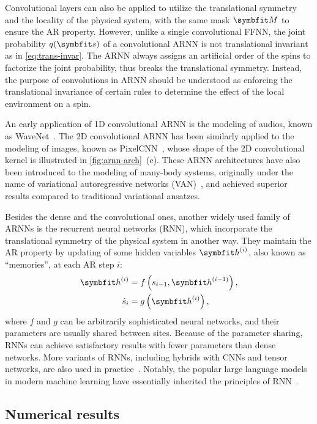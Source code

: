 Convolutional layers can also be applied to utilize the translational symmetry and the locality of the physical system, with the same mask $\mM$ to ensure the AR property. However, unlike a single convolutional FFNN, the joint probability $q(\vs)$ of a convolutional ARNN is not translational invariant as in \cref{eq:trans-invar}. The ARNN always assigns an artificial order of the spins to factorize the joint probability, thus breaks the translational symmetry. Instead, the purpose of convolutions in ARNN should be understood as enforcing the translational invariance of certain rules to determine the effect of the local environment on a spin.

An early application of 1D convolutional ARNN is the modeling of audios, known as WaveNet~\cite{oord2016wavenet}. The 2D convolutional ARNN has been similarly applied to the modeling of images, known as PixelCNN~\cite{oord2016pixel}, whose shape of the 2D convolutional kernel is illustrated in \cref{fig:arnn-arch}~(c). These ARNN architectures have also been introduced to the modeling of many-body systems, originally under the name of variational autoregressive networks (VAN)~\cite{wu2019solving}, and achieved superior results compared to traditional variational ansatzes.

Besides the dense and the convolutional ones, another widely used family of ARNNs is the recurrent neural networks (RNN), which incorporate the translational symmetry of the physical system in another way. They maintain the AR property by updating of some hidden variables $\vh^{(i)}$, also known as ``memories'', at each AR step $i$:
\begin{align}
\vh^{(i)} &= f\left( s_{i - 1}, \vh^{(i - 1)} \right), \\
\hat{s}_i &= g\left( \vh^{(i)} \right),
\end{align}
where $f$ and $g$ can be arbitrarily sophisticated neural networks, and their parameters are usually shared between sites. Because of the parameter sharing, RNNs can achieve satisfactory results with fewer parameters than dense networks. More variants of RNNs, including hybrids with CNNs and tensor networks, are also used in practice~\cite{oord2016pixel, khandoker2023supplementing}. Notably, the popular large language models in modern machine learning have essentially inherited the principles of RNN~\cite{brown2020language}.

\subsection{Numerical results}

